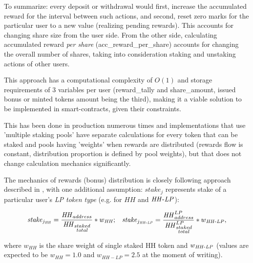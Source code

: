 \documentclass[12pt]{article}
\begin{document}
To summarize: every deposit or withdrawal would first, increase the accumulated reward for the interval between such actions, and second, reset zero marks for the particular user to a new value (realizing pending rewards). This accounts for changing share size from the user side. From the other side, calculating accumulated reward \emph{per share} (acc\_reward\_per\_share) accounts for changing the overall number of shares, taking into consideration staking and unstaking actions of other users.

This approach has a computational complexity of $O(1)$ and storage requirements of 3 variables per user (reward\_tally and share\_amount, issued bonus or minted tokens amount being the third), making it a viable solution to be implemented in smart-contracts, given their constraints.

This has been done in production numerous times and implementations that use 'multiple staking pools' \cite{sushichef} have separate calculations for every token that can be staked and pools having 'weights' when rewards are distributed (rewards flow is constant, distribution proportion is defined by pool weights), but that does not change calculation mechanics significantly.

\bigskip

The mechanics of rewards (bonus) distribution is closely following approach described in \cite{solmaz}, with one additional assumption: $\mathit{stake}_{j}$ represents stake of a particular user's \emph{LP token type} (e.g. for $\mathit{HH}$ and $\mathit{HH{\text -}LP}$):

\begin{equation}
  \begin{split}
    \mathit{stake}_{j_{\mathit{HH}}}=\frac{\mathit{HH}_{address}}{\mathit{HH}_{\substack{staked\\total}}} * w_{\mathit{HH}};
  \end{split}
\quad
  \begin{split}
    \mathit{stake}_{j_{\mathit{HH{\text -}LP}}}=\frac{\mathit{HH}^{LP}_{address}}{\mathit{HH}^{LP}_{\substack{staked\\total}}} * w_{\mathit{HH{\text -}LP}},
  \end{split}
\end{equation}

where $w_{\mathit{HH}}$ is the share weight of single staked HH token and $w_{\mathit{HH{\text -}LP}}$ (values are expected to be $w_{\mathit{HH}}=1.0$ and $w_{\mathit{HH-LP}}=2.5$ at the moment of writing).
\end{document}
